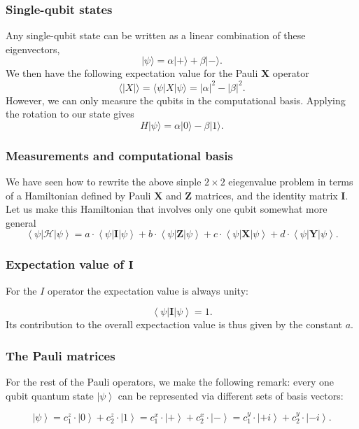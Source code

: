 \documentclass{beamer}
\begin{document}
\begin{frame}
\frametitle{Single-qubit states}

Any single-qubit state can be written as a linear combination of these eigenvectors,
\[
\vert \psi\rangle = \alpha \vert +\rangle + \beta \vert -\rangle.
\]
We then have the following expectation value for the Pauli $\bm{X}$ operator
\[
\langle \vert X\vert \rangle = \langle \psi\vert X \vert \psi\rangle = |\alpha|^2 - |\beta|^2.
\]
However, we can only measure the qubits in the computational basis. Applying the rotation to our state gives
\[
H \vert \psi\rangle = \alpha \vert 0\rangle - \beta \vert 1\rangle.
\]
\end{frame}

\begin{frame}
\frametitle{Measurements and computational basis}

We have seen how to rewrite the above sinple $2\times 2$ eiegenvalue problem in terms of a Hamiltonian defined by Pauli $\bm{X}$ and $\bm{Z}$ matrices,
and the identity matrix $\bm{I}$.
Let us make this Hamiltonian that involves only one qubit somewhat more general
\[
\left\langle \psi \right| \mathcal{H} \left| \psi \right\rangle = a \cdot \left\langle \psi \right| \bm{I} \left| \psi \right\rangle + b \cdot \left\langle \psi \right| \bm{Z} \left| \psi \right\rangle + c \cdot \left\langle \psi \right| \bm{X} \left| \psi \right\rangle + d \cdot \left\langle \psi \right| \bm{Y} \left| \psi \right\rangle.
\]
\end{frame}

\begin{frame}
\frametitle{Expectation value of $\bm{I}$}

For the $I$ operator the expectation value is always unity:

\[
\left\langle \psi \right| \bm{I} \left| \psi \right\rangle = 1.
\]
Its contribution to the overall expectaction value is thus given by the constant $a$.
\end{frame}

\begin{frame}
\frametitle{The Pauli matrices}

For the rest of the Pauli operators, we make the following remark:
every one qubit quantum state $\left| \psi \right\rangle$ can be
represented via different sets of basis vectors:

\[
\left| \psi \right\rangle = c_1^z \cdot \left| 0 \right\rangle + c_2^z \cdot \left| 1 \right\rangle = c_1^x \cdot \left| + \right\rangle + c_2^x \cdot \left| - \right\rangle = c_1^y \cdot \left| +i \right\rangle + c_2^y \cdot \left| -i \right\rangle.
\]
\end{frame}
\end{document}
